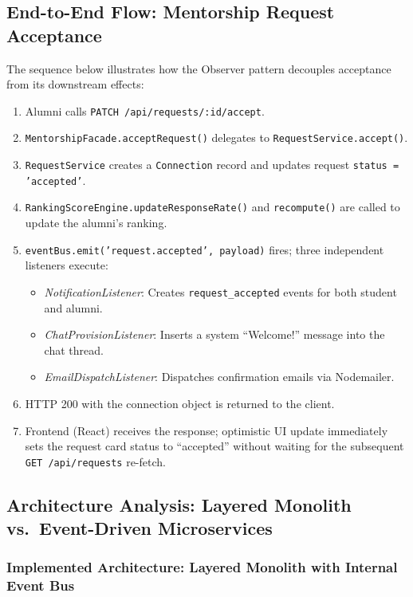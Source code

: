 \documentclass[12pt,a4paper]{article}
\begin{document}
\subsection{End-to-End Flow: Mentorship Request Acceptance}

The sequence below illustrates how the Observer pattern decouples acceptance from its downstream effects:

\begin{enumerate}
  \item Alumni calls \texttt{PATCH /api/requests/:id/accept}.
  \item \texttt{MentorshipFacade.acceptRequest()} delegates to \texttt{RequestService.accept()}.
  \item \texttt{RequestService} creates a \texttt{Connection} record and updates request \texttt{status = 'accepted'}.
  \item \texttt{RankingScoreEngine.updateResponseRate()} and \texttt{recompute()} are called to update the alumni's ranking.
  \item \texttt{eventBus.emit('request.accepted', payload)} fires; three independent listeners execute:
    \begin{itemize}
      \item \textit{NotificationListener}: Creates \texttt{request\_accepted} events for both student and alumni.
      \item \textit{ChatProvisionListener}: Inserts a system ``Welcome!'' message into the chat thread.
      \item \textit{EmailDispatchListener}: Dispatches confirmation emails via Nodemailer.
    \end{itemize}
  \item HTTP 200 with the connection object is returned to the client.
  \item Frontend (React) receives the response; optimistic UI update immediately sets the request card status to ``accepted'' without waiting for the subsequent \texttt{GET /api/requests} re-fetch.
\end{enumerate}

\subsection{Architecture Analysis: Layered Monolith vs.\ Event-Driven Microservices}

\subsubsection{Implemented Architecture: Layered Monolith with Internal Event Bus}
\end{document}
